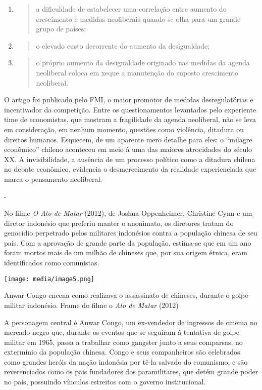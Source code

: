 \begin{enumerate}
\def\labelenumi{\alph{enumi})}
\item
  \begin{quote}
  a dificuldade de estabelecer uma correlação entre aumento do
  crescimento e medidas neoliberais quando se olha para um grande grupo
  de países;
  \end{quote}
\item
  \begin{quote}
  o elevado custo decorrente do aumento da desigualdade;
  \end{quote}
\item
  \begin{quote}
  o próprio aumento da desigualdade originado nas medidas da agenda
  neoliberal coloca em xeque a manutenção do suposto crescimento
  neoliberal.
  \end{quote}
\end{enumerate}

O artigo foi publicado pelo FMI, o maior promotor de medidas
desregulatórias e incentivador da competição. Entre os questionamentos
levantados pelo experiente time de economistas, que mostram a
fragilidade da agenda neoliberal, não se leva em consideração, em nenhum
momento, questões como violência, ditadura ou direitos humanos.
Esquecem, de um aparente mero detalhe para eles: o ``milagre econômico''
chileno aconteceu em meio à uma das maiores atrocidades do século XX. A
invisibilidade, a ausência de um processo político como a ditadura
chilena no debate econômico, evidencia o desmerecimento da realidade
experienciada que marca o pensamento neoliberal.

-

No filme \emph{O Ato de Matar} (2012), de Joshua Oppenheimer, Christine
Cynn e um diretor indonésio que preferiu manter o anonimato, os
diretores tratam do genocídio perpetrado pelos militares indonésios
contra a população chinesa de seu país. Com a aprovação de grande parte
da população, estima-se que em um ano foram mortos mais de um milhão de
chineses que, por sua origem étnica, eram identificados como comunistas.

\texttt{[image: media/image5.png]}

Anwar Congo encena como realizava o assassinato de chineses, durante o
golpe militar indonésio. Frame do filme o \emph{Ato de Matar} (2012)

A personagem central é Anwar Congo, um ex-vendedor de ingressos de
cinema no mercado negro que, durante os eventos que se seguiram à
tentativa de golpe militar em 1965, passa a trabalhar como gangster
junto a seus comparsas, no extermínio da população chinesa. Congo e seus
companheiros são celebrados como grandes heróis da nação indonésia por
tê-la salvado do comunismo, e são reverenciados como os pais fundadores
dos paramilitares, que detém grande poder no país, possuindo vínculos
estreitos com o governo institucional.


